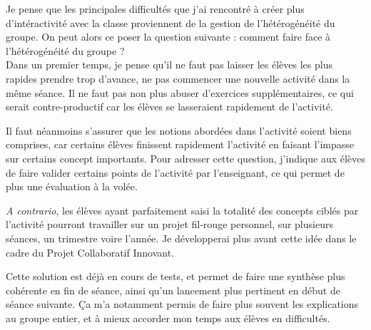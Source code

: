 \documentclass[pdftex,a4paper,12pt]{article}
\begin{document}
	Je pense que les principales difficultés que j'ai rencontré à créer plus d'intéractivité avec la classe proviennent de la gestion de l'hétérogénéité du groupe.
	On peut alors ce poser la question suivante : comment faire face à l'hétérogénéité du groupe ?\\

	Dans un premier temps, je pense qu'il ne faut pas laisser les élèves les plus rapides prendre trop d'avance, 
	ne pas commencer une nouvelle activité dans la même séance.
	Il ne faut pas non plus abuser d'exercices supplémentaires, ce qui serait contre-productif car les élèves se lasseraient rapidement de l'activité.

	Il faut néanmoins s'assurer que les notions abordées dans l'activité soient biens comprises, 
	car certains élèves finissent rapidement l'activité en faisant l'impasse sur certains concept importants.
	Pour adresser cette question, j'indique aux élèves de faire valider certains points de l'activité par l'enseignant, ce qui permet de plus une évaluation à la volée.

	\emph{A contrario}, les élèves ayant parfaitement saisi la totalité des concepts ciblés par l'activité 
	pourront travailler sur un projet \og{}fil-rouge\fg{} personnel, sur plusieurs séances, un trimestre voire l'année.
	Je développerai plus avant cette idée dans le cadre du \og{}Projet Collaboratif Innovant\fg{}.

	Cette solution est déjà en cours de tests, et permet de faire une synthèse plus cohérente en fin de séance, 
	ainsi qu'un lancement plus pertinent en début de séance suivante.
	Ça m'a notamment permis de faire plus souvent les explications au groupe entier, et à mieux accorder mon temps aux élèves en difficultés.\\
\end{document}
